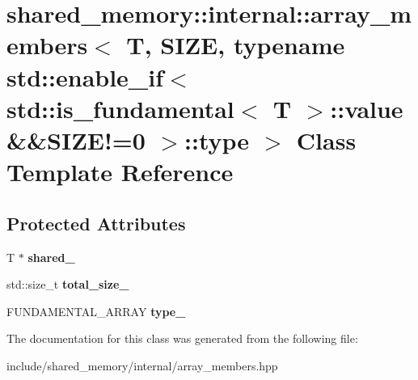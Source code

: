 \hypertarget{classshared__memory_1_1internal_1_1array__members_3_01T_00_01SIZE_00_01typename_01std_1_1enable_de9984c52d14535c26d7a424fbd87fe2}{}\section{shared\+\_\+memory\+:\+:internal\+:\+:array\+\_\+members$<$ T, S\+I\+ZE, typename std\+:\+:enable\+\_\+if$<$ std\+:\+:is\+\_\+fundamental$<$ T $>$\+:\+:value \&\&S\+I\+Z\+E!=0 $>$\+:\+:type $>$ Class Template Reference}
\label{classshared__memory_1_1internal_1_1array__members_3_01T_00_01SIZE_00_01typename_01std_1_1enable_de9984c52d14535c26d7a424fbd87fe2}
\subsection*{Protected Attributes}
\begin{DoxyCompactItemize}
\item 
T $\ast$ {\bfseries shared\+\_\+}\hypertarget{classshared__memory_1_1internal_1_1array__members_3_01T_00_01SIZE_00_01typename_01std_1_1enable_de9984c52d14535c26d7a424fbd87fe2_a60ff01b32fcd11f1d5ac88100a03db56}{}\label{classshared__memory_1_1internal_1_1array__members_3_01T_00_01SIZE_00_01typename_01std_1_1enable_de9984c52d14535c26d7a424fbd87fe2_a60ff01b32fcd11f1d5ac88100a03db56}

\item 
std\+::size\+\_\+t {\bfseries total\+\_\+size\+\_\+}\hypertarget{classshared__memory_1_1internal_1_1array__members_3_01T_00_01SIZE_00_01typename_01std_1_1enable_de9984c52d14535c26d7a424fbd87fe2_aab03a8a0adcc6785817b2e479393a7b7}{}\label{classshared__memory_1_1internal_1_1array__members_3_01T_00_01SIZE_00_01typename_01std_1_1enable_de9984c52d14535c26d7a424fbd87fe2_aab03a8a0adcc6785817b2e479393a7b7}

\item 
F\+U\+N\+D\+A\+M\+E\+N\+T\+A\+L\+\_\+\+A\+R\+R\+AY {\bfseries type\+\_\+}\hypertarget{classshared__memory_1_1internal_1_1array__members_3_01T_00_01SIZE_00_01typename_01std_1_1enable_de9984c52d14535c26d7a424fbd87fe2_a3f4c0352b10f1edbacd8b543f1a0c787}{}\label{classshared__memory_1_1internal_1_1array__members_3_01T_00_01SIZE_00_01typename_01std_1_1enable_de9984c52d14535c26d7a424fbd87fe2_a3f4c0352b10f1edbacd8b543f1a0c787}

\end{DoxyCompactItemize}


The documentation for this class was generated from the following file\+:\begin{DoxyCompactItemize}
\item 
include/shared\+\_\+memory/internal/array\+\_\+members.\+hpp\end{DoxyCompactItemize}
